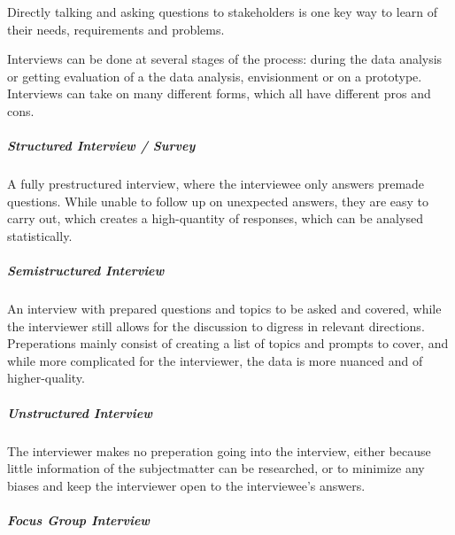 \begin{method}[Interview] \label{meth:interview} 
  Directly talking and asking questions to stakeholders is one key way to learn
  of their needs, requirements and problems. 
  
  Interviews can be done at several stages of the process: during the data
  analysis or getting evaluation of a the data analysis, envisionment or on a
  prototype. Interviews can take on many different forms, which all have different pros and
  cons.
  \cite[p. 142-146]{benyon14}
\end{method}

\subparagraph{Structured Interview / Survey} 
A fully prestructured interview, where the interviewee only answers premade
questions. While unable to follow up on unexpected answers, they are easy to
carry out, which creates a high-quantity of responses, which can be analysed
statistically.
\cite[p. 142]{benyon14}

\subparagraph{Semistructured Interview} 
An interview with prepared questions and topics to be asked and covered, while
the interviewer still allows for the discussion to digress in relevant
directions. Preperations mainly consist of creating a list of topics and prompts
to cover, and while more complicated for the interviewer, the data is more
nuanced and of higher-quality.
\cite[p. 143]{benyon14}

\subparagraph{Unstructured Interview} 
The interviewer makes no preperation going into the interview, either because
little information of the subjectmatter can be researched, or to minimize any
biases and keep the interviewer open to the interviewee's answers.
\cite[p. 143]{benyon14}

\subparagraph{Focus Group Interview} 
\todo